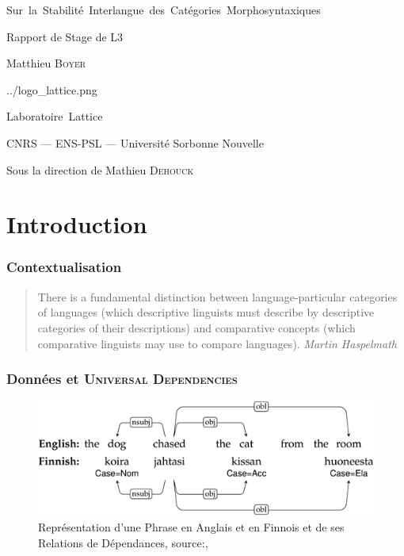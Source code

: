\documentclass[noamsthm]{beamercours}
\begin{document}
\begin{frame}
        \reporttitleframe%
        {}
        {\centering %
                {\Large\sc Sur\, la\, Stabilité\, Interlangue\, des\, Catégories\, Morphosyntaxiques\par}
                \vspace{5pt}
                {Rapport de Stage de L3\par}
                \vspace{5pt}
                {Matthieu \textsc{Boyer}\par}
        }
        {../logo_lattice.png}
        {\centering %
                \vspace{3pt}
                {\sc Laboratoire\, Lattice \par}
                \vspace{4pt} %
                {\sc CNRS --- ENS-PSL --- Université Sorbonne Nouvelle\par}
                \vspace{6pt} %
                {Sous la direction de Mathieu \textsc{Dehouck}\par}}
\end{frame}

\section{Introduction}\label{sec:introduction}
\begin{frame}
        \frametitle{Contextualisation}\label{subsec:contextualisation}
        \begin{quote}
                There is a fundamental distinction between language-particular categories of languages (which descriptive linguists must describe by descriptive categories of their descriptions) and comparative concepts (which comparative linguists may use to compare languages).
                {\flushright \textit{Martin Haspelmath} \cite{Has18}}
        \end{quote}
\end{frame}

\begin{frame}
        \frametitle{Données et \textsc{Universal Dependencies}}\label{subsec:données}
        \begin{figure}
                \centering
                \includegraphics[width=\textwidth]{Figures/Visualisations/simplified_ud_annotation}
                \caption{Représentation d'une Phrase en Anglais et en Finnois et de ses Relations de Dépendances, source:\cite{UDv2}, \cite{UD214}}
                \label{fig:ud_annot}
        \end{figure}
\end{frame}
\end{document}
